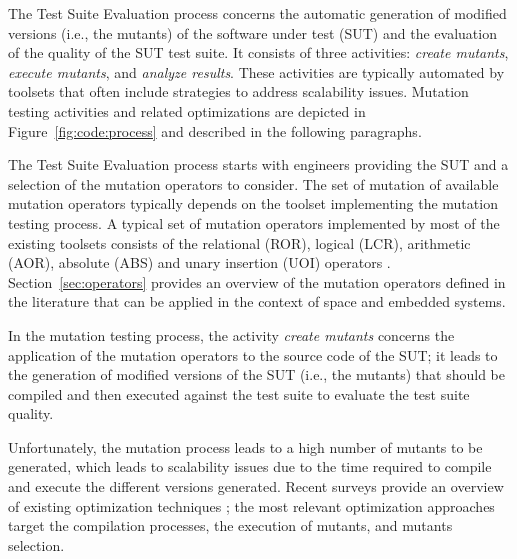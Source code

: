 The Test Suite Evaluation process concerns the automatic generation of modified versions (i.e., the mutants) of the software under test (SUT) and the evaluation of the quality of the SUT test suite. It consists of three activities: \emph{create mutants}, \emph{execute mutants}, and \emph{analyze results}. 
These activities are typically automated by toolsets that often include strategies to address scalability issues. Mutation testing activities and related optimizations are depicted in Figure~\ref{fig:code:process} and described in the following paragraphs.

The Test Suite Evaluation process starts with engineers providing the SUT and a selection of the mutation operators to consider. The set of mutation of available mutation operators typically depends on the toolset implementing the mutation testing process. 
A typical set of mutation operators implemented by most of the existing toolsets consists of the relational (ROR), logical (LCR), arithmetic (AOR), absolute (ABS) and unary insertion (UOI) operators \cite{rothermel1996experimental}. 
Section~\ref{sec:operators} provides an overview of the mutation operators defined in the literature that can be applied in the context of space and embedded systems.

In the mutation testing process, the activity \emph{create mutants} concerns the application of the mutation operators to the source code of the SUT; it leads to the generation of modified versions of the SUT (i.e., the mutants) that should be compiled and then executed against the test suite to evaluate the test suite quality. 

Unfortunately, the mutation process leads to a high number of mutants to be generated, which leads to scalability issues due to the time required to compile and execute the different versions generated. Recent surveys provide an overview of existing optimization techniques \cite{ferrari2018systematic}; the most relevant optimization approaches target the compilation processes, the execution of mutants, and mutants selection. 

